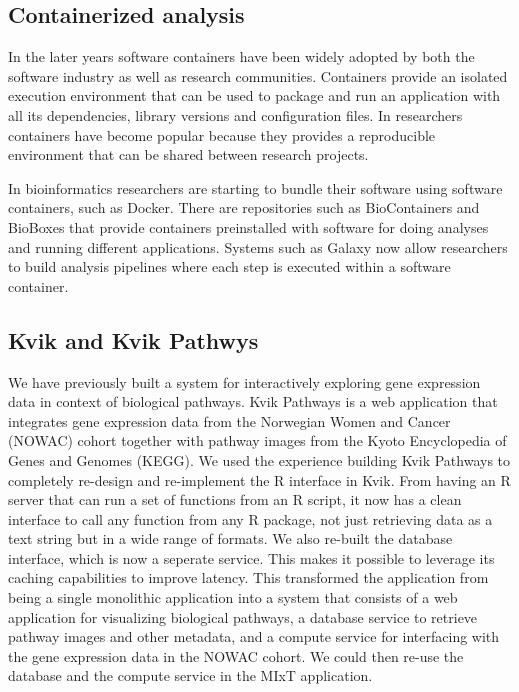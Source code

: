 
\subsection*{Containerized analysis} 
In the later years software containers have been widely adopted by both
the software industry as well as research communities. Containers provide an
isolated execution environment that can be used to package and run
an application with all its dependencies, library versions and configuration
files. In researchers containers have become popular because they provides a
reproducible environment that can be shared between research projects. 

In bioinformatics researchers are starting to bundle their software using
software containers, such as Docker. There are repositories such as
BioContainers\cite{dabiocontainers} and BioBoxes\cite{Belmann2015} that provide
containers preinstalled with software for doing analyses and running different
applications. Systems such as Galaxy now allow researchers to build analysis
pipelines where each step is executed within a software container. 


\subsection*{Kvik and Kvik Pathwys}
We have previously built a system for interactively exploring gene expression
data in context of  biological pathways.\cite{fjukstad2015kvik} Kvik Pathways is
a web application that integrates gene expression data from the Norwegian Women
and Cancer (NOWAC) cohort together with pathway images from the Kyoto
Encyclopedia of Genes and Genomes (KEGG). We used the experience building Kvik
Pathways to completely re-design and re-implement
the R interface in Kvik. From having an R server that can run a set of functions
from an R script, it now has a clean interface to call any function from any R
package, not just retrieving data as a text string but in a wide range of
formats. We also re-built the database interface, which is now a seperate
service. This makes it possible to leverage its caching capabilities to improve
latency. This transformed the application from being a single monolithic
application into a system that
consists of a web application for visualizing biological pathways, a database
service to retrieve pathway images and other metadata, and a compute service for
interfacing with the gene expression data in the NOWAC cohort. We could then
re-use the database and the compute service in the MIxT application. 

